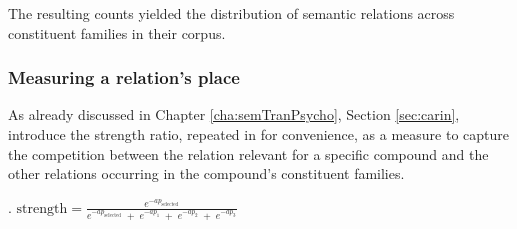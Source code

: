 The resulting counts yielded the distribution of semantic relations across constituent
families in their corpus.


\subsubsection{Measuring a relation's place}
\label{sec:gagneShobenMeasuringARelationsPlace}


As already discussed in Chapter \ref{cha:semTranPsycho}, Section
\ref{sec:carin}, \citet{GagneandShoben:1997} introduce the 
strength ratio, repeated in \Next for convenience, as a measure to capture the competition between the
relation relevant for a specific compound and the other relations
occurring in the compound's constituent families.  

\ex. %
\label{ex:strength-ratio-rep}
\( \displaystyle \text{strength} = \frac{e^{-ap_{\text{selected}}}}{e^{-ap_{\text{selected}}}\; + \;
e^{-ap_{1}} \; + \; e^{-ap_{2}}\; +\; e^{-ap_{3}}} \)

